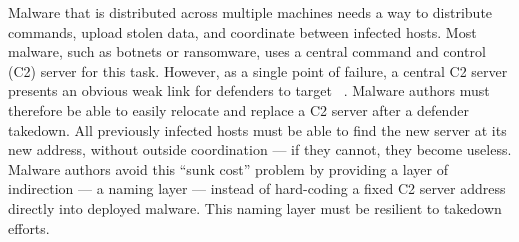 \documentclass[conference]{IEEEtran}
\begin{document}

Malware that is distributed across multiple machines needs a way to distribute commands, upload stolen 
data, and coordinate between infected hosts. Most malware, such as botnets or ransomware, uses a 
central command and control (C2) server for this task. However, as a single point of failure, a 
central C2 server presents an obvious weak link for defenders to target 
~\cite{kesari_deterring_2017}. 
Malware authors must therefore be able to easily relocate and replace a C2 server after a defender 
takedown. All previously infected hosts must be able to find the new server at its new address, 
without outside coordination --- if they cannot, they become useless. Malware authors avoid 
this ``sunk cost'' problem by providing a layer of indirection --- a naming layer --- instead of 
hard-coding a fixed C2 server address directly into deployed malware. This naming layer must be 
resilient to takedown efforts.
\end{document}
